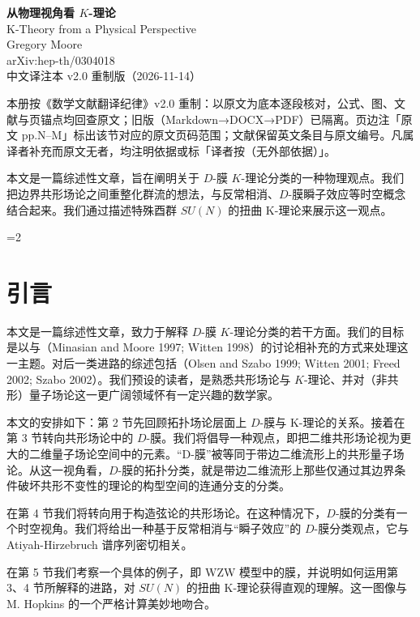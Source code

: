 \documentclass[11pt,a4paper]{ctexart}
\newcommand{\SrcRange}[2]{\ifnum#1=#2\marginpar{\raggedright\footnotesize 原文 p.#1}\else\marginpar{\raggedright\footnotesize 原文 pp.#1--#2}\fi}
\begin{document}
\begin{center}
{\LARGE\bfseries 从物理视角看 $K$-理论}\\[6pt]
{\large K-Theory from a Physical Perspective}\\[6pt]
Gregory Moore\\[2pt]
{\small arXiv:hep-th/0304018}\\[8pt]
{\small 中文译注本 v2.0 重制版（2026-11-14）}
\end{center}
\vspace{0.6em}
 本册按《数学文献翻译纪律》v2.0 重制：以原文为底本逐段核对，公式、图、文献与页锚点均回查原文；旧版（Markdown→DOCX→PDF）已隔离。页边注「原文 pp.N--M」标出该节对应的原文页码范围；文献保留英文条目与原文编号。凡属译者补充而原文无者，均注明依据或标「译者按（无外部依据）」。
\vspace{1em}

\providecommand{\tightlist}{\setlength{\itemsep}{0pt}\setlength{\parskip}{0pt}}
本文是一篇综述性文章，旨在阐明关于 \(D\)-膜 \(K\)-理论分类的一种物理观点。我们把边界共形场论之间重整化群流的想法，与反常相消、\(D\)-膜瞬子效应等时空概念结合起来。我们通过描述特殊酉群 \(SU(N)\) 的扭曲 K-理论来展示这一观点。

\SrcRange{2}{2}
\section{引言}\label{ux5f15ux8a00}

本文是一篇综述性文章，致力于解释 \(D\)-膜 \(K\)-理论分类的若干方面。我们的目标是以与（Minasian and Moore 1997; Witten 1998）的讨论相补充的方式来处理这一主题。对后一类进路的综述包括（Olsen and Szabo 1999; Witten 2001; Freed 2002; Szabo 2002）。我们预设的读者，是熟悉共形场论与 \(K\)-理论、并对（非共形）量子场论这一更广阔领域怀有一定兴趣的数学家。

本文的安排如下：第 2 节先回顾拓扑场论层面上 \(D\)-膜与 K-理论的关系。接着在第 3 节转向共形场论中的 \(D\)-膜。我们将倡导一种观点，即把二维共形场论视为更大的二维量子场论空间中的元素。``D-膜''被等同于带边二维流形上的共形量子场论。从这一视角看，\(D\)-膜的拓扑分类，就是带边二维流形上那些仅通过其边界条件破坏共形不变性的理论的构型空间的连通分支的分类。

在第 4 节我们将转向用于构造弦论的共形场论。在这种情况下，\(D\)-膜的分类有一个时空视角。我们将给出一种基于反常相消与``瞬子效应''的 \(D\)-膜分类观点，它与 Atiyah-Hirzebruch 谱序列密切相关。

在第 5 节我们考察一个具体的例子，即 WZW 模型中的膜，并说明如何运用第 3、4 节所解释的进路，对 \(SU(N)\) 的扭曲 K-理论获得直观的理解。这一图像与 M. Hopkins 的一个严格计算美妙地吻合。
\end{document}
